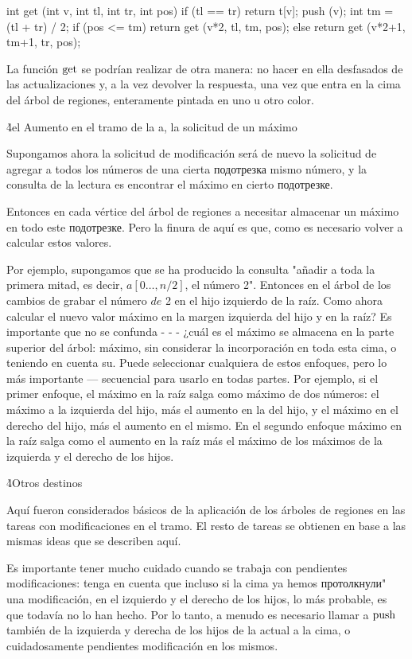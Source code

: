 int get (int v, int tl, int tr, int pos) {
if (tl == tr)
return t[v];
push (v);
int tm = (tl + tr) / 2;
if (pos <= tm)
return get (v*2, tl, tm, pos);
else
return get (v*2+1, tm+1, tr, pos);
}
\endcode

La función $\rm get$ se podrían realizar de otra manera: no hacer en ella desfasados de las actualizaciones y, a la vez devolver la respuesta, una vez que entra en la cima del árbol de regiones, enteramente pintada en uno u otro color.

\h4{el Aumento en el tramo de la a, la solicitud de un máximo}

Supongamos ahora la solicitud de modificación será de nuevo la solicitud de agregar a todos los números de una cierta подотрезка mismo número, y la consulta de la lectura es encontrar el máximo en cierto подотрезке.

Entonces en cada vértice del árbol de regiones a necesitar almacenar un máximo en todo este подотрезке. Pero la finura de aquí es que, como es necesario volver a calcular estos valores.

Por ejemplo, supongamos que se ha producido la consulta "añadir a toda la primera mitad, es decir, $a[0 \ldots, n/2]$, el número 2". Entonces en el árbol de los cambios de grabar el número $de$ 2 en el hijo izquierdo de la raíz. Como ahora calcular el nuevo valor máximo en la margen izquierda del hijo y en la raíz? Es importante que no se confunda - - - ¿cuál es el máximo se almacena en la parte superior del árbol: máximo, sin considerar la incorporación en toda esta cima, o teniendo en cuenta su. Puede seleccionar cualquiera de estos enfoques, pero lo más importante --- secuencial para usarlo en todas partes. Por ejemplo, si el primer enfoque, el máximo en la raíz salga como máximo de dos números: el máximo a la izquierda del hijo, más el aumento en la del hijo, y el máximo en el derecho del hijo, más el aumento en el mismo. En el segundo enfoque máximo en la raíz salga como el aumento en la raíz más el máximo de los máximos de la izquierda y el derecho de los hijos.

\h4{Otros destinos}

Aquí fueron considerados básicos de la aplicación de los árboles de regiones en las tareas con modificaciones en el tramo. El resto de tareas se obtienen en base a las mismas ideas que se describen aquí.

Es importante tener mucho cuidado cuando se trabaja con pendientes modificaciones: tenga en cuenta que incluso si la cima ya hemos протолкнули" una modificación, en el izquierdo y el derecho de los hijos, lo más probable, es que todavía no lo han hecho. Por lo tanto, a menudo es necesario llamar a $\rm push$ también de la izquierda y derecha de los hijos de la actual a la cima, o cuidadosamente pendientes modificación en los mismos.


